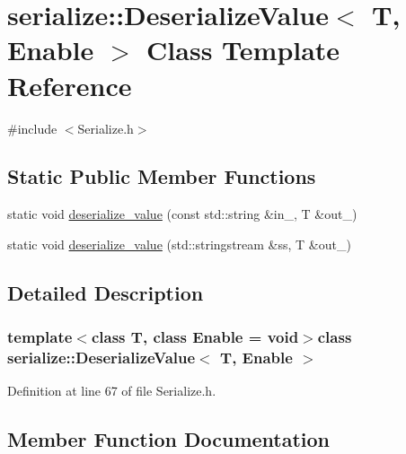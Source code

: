 \hypertarget{classserialize_1_1_deserialize_value}{}\section{serialize\+:\+:Deserialize\+Value$<$ T, Enable $>$ Class Template Reference}
\label{classserialize_1_1_deserialize_value}


{\ttfamily \#include $<$Serialize.\+h$>$}

\subsection*{Static Public Member Functions}
\begin{DoxyCompactItemize}
\item 
static void \hyperlink{classserialize_1_1_deserialize_value_ae086cfe3996b96c0a82785afe0af81b1}{deserialize\+\_\+value} (const std\+::string \&in\+\_\+, T \&out\+\_\+)
\item 
static void \hyperlink{classserialize_1_1_deserialize_value_a85960dc8ca3587ca9c275c0deb679bb7}{deserialize\+\_\+value} (std\+::stringstream \&ss, T \&out\+\_\+)
\end{DoxyCompactItemize}


\subsection{Detailed Description}
\subsubsection*{template$<$class T, class Enable = void$>$class serialize\+::\+Deserialize\+Value$<$ T, Enable $>$}



Definition at line 67 of file Serialize.\+h.



\subsection{Member Function Documentation}
\hypertarget{classserialize_1_1_deserialize_value_ae086cfe3996b96c0a82785afe0af81b1}{}
